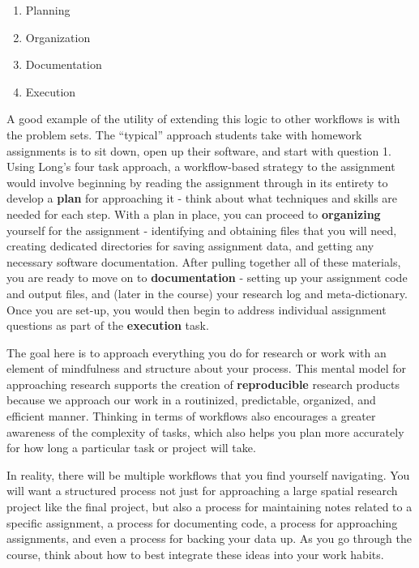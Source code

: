 \documentclass[]{book}
\providecommand{\tightlist}{%
  \setlength{\itemsep}{0pt}\setlength{\parskip}{0pt}}
\theoremstyle{definition}
\theoremstyle{definition}
\theoremstyle{definition}
\theoremstyle{remark}
\begin{document}
\begin{enumerate}
\def\labelenumi{\arabic{enumi}.}
\tightlist
\item
  Planning
\item
  Organization
\item
  Documentation
\item
  Execution
\end{enumerate}

A good example of the utility of extending this logic to other workflows
is with the problem sets. The ``typical'' approach students take with
homework assignments is to sit down, open up their software, and start
with question 1. Using Long's four task approach, a workflow-based
strategy to the assignment would involve beginning by reading the
assignment through in its entirety to develop a \textbf{plan} for
approaching it - think about what techniques and skills are needed for
each step. With a plan in place, you can proceed to \textbf{organizing}
yourself for the assignment - identifying and obtaining files that you
will need, creating dedicated directories for saving assignment data,
and getting any necessary software documentation. After pulling together
all of these materials, you are ready to move on to
\textbf{documentation} - setting up your assignment code and output
files, and (later in the course) your research log and meta-dictionary.
Once you are set-up, you would then begin to address individual
assignment questions as part of the \textbf{execution} task.

The goal here is to approach everything you do for research or work with
an element of mindfulness and structure about your process. This mental
model for approaching research supports the creation of
\textbf{reproducible} research products because we approach our work in
a routinized, predictable, organized, and efficient manner. Thinking in
terms of workflows also encourages a greater awareness of the complexity
of tasks, which also helps you plan more accurately for how long a
particular task or project will take.

In reality, there will be multiple workflows that you find yourself
navigating. You will want a structured process not just for approaching
a large spatial research project like the final project, but also a
process for maintaining notes related to a specific assignment, a
process for documenting code, a process for approaching assignments, and
even a process for backing your data up. As you go through the course,
think about how to best integrate these ideas into your work habits.
\end{document}
